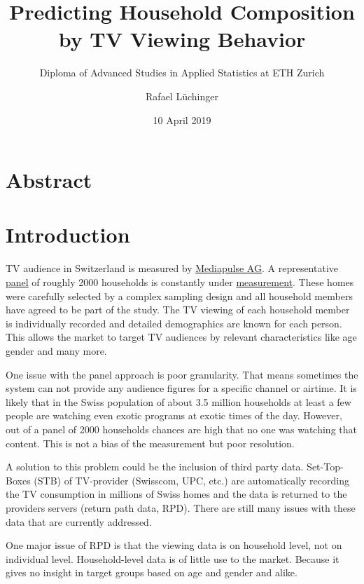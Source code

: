 \documentclass[]{article}
\title{Predicting Household Composition by TV Viewing Behavior}
\subtitle{Diploma of Advanced Studies in Applied Statistics at ETH Zurich}
\author{Rafael Lüchinger}
\date{10 April 2019}
\begin{document}
\maketitle

{
\setcounter{tocdepth}{2}
\tableofcontents
}
\section{Abstract}\label{abstract}

\section{Introduction}\label{introduction}

TV audience in Switzerland is measured by
\href{https:://www.mediapulse.ch/en}{Mediapulse AG}. A representative
\href{https:://www.mediapulse.ch/en/tv/research-method/the-panel.html}{panel}
of roughly 2000 households is constantly under
\href{https:://www.mediapulse.ch/en/tv/research-method/the-measuring-technique.html}{measurement}.
These homes were carefully selected by a complex sampling design and all
household members have agreed to be part of the study. The TV viewing of
each household member is individually recorded and detailed demographics
are known for each person. This allows the market to target TV audiences
by relevant characteristics like age gender and many more.

One issue with the panel approach is poor granularity. That means
sometimes the system can not provide any audience figures for a specific
channel or airtime. It is likely that in the Swiss population of about
3.5 million households at least a few people are watching even exotic
programs at exotic times of the day. However, out of a panel of 2000
households chances are high that no one was watching that content. This
is not a bias of the measurement but poor resolution.

A solution to this problem could be the inclusion of third party data.
Set-Top-Boxes (STB) of TV-provider (Swisscom, UPC, etc.) are
automatically recording the TV consumption in millions of Swiss homes
and the data is returned to the providers servers (return path data,
RPD). There are still many issues with these data that are currently
addressed.

One major issue of RPD is that the viewing data is on household level,
not on individual level. Household-level data is of little use to the
market. Because it gives no insight in target groups based on age and
gender and alike.
\end{document}
